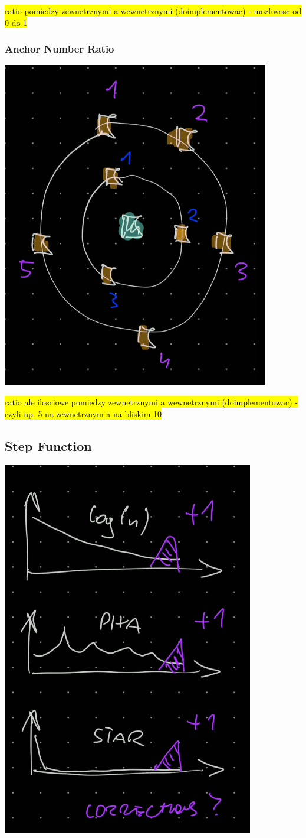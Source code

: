 \documentclass{article}
\begin{document}
\hl{ratio pomiedzy zewnetrznymi a wewnetrznymi (doimplementowac) - mozliwosc od
0 do 1}

\subsubsection{Anchor Number Ratio}

\includegraphics[width=0.5\linewidth]{../figures/idea_anchor_number_ratio}

\hl{ratio ale ilosciowe pomiedzy zewnetrznymi a wewnetrznymi (doimplementowac) -
czyli np. 5 na zewnetrznym a na bliskim 10}

\subsection{Step Function} %

\includegraphics[width=0.5\linewidth]{../figures/idea_step_function}
\end{document}
